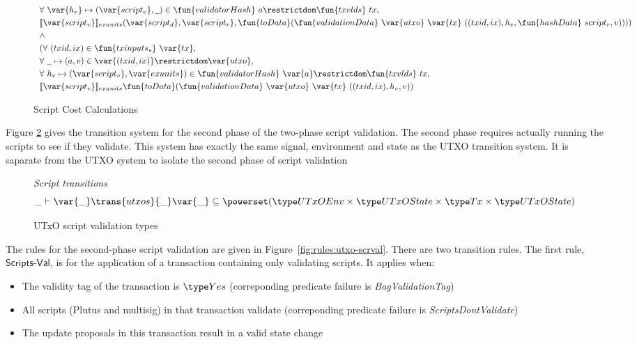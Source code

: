 \begin{figure}[htb]
\begin{align*}
    & ~~\forall ~\var{h_v}\mapsto (\var{script_v},\wcard)\in \fun{validatorHash}~{a}\restrictdom\fun{txvlds}~{tx}, \\
    & ~~ \llbracket \var{script_v} \rrbracket_{exunits} (\var{script_d},\var{script_r},
    \fun{toData}(\fun{validationData}~\var{utxo}~\var{tx}~
      ((txid,ix),h_v,\fun{hashData}~{script_r},v))) ) \\
    & ~~\wedge~ \\
    & ~~(\forall~(txid,ix) \in \fun{txinputs_s}~\var{tx}, \\
    & ~~ \forall~\wcard \mapsto (a,v) \in \var{(txid,ix)}\restrictdom\var{utxo}, \\
    & ~~\forall ~h_v\mapsto (\var{script_v},\var{exunits})\in
     \fun{validatorHash}~\var{a}\restrictdom\fun{txvlds}~{tx}, \\
    & ~~ \llbracket \var{script_v} \rrbracket_{exunits}
    \fun{toData}(\fun{validationData}~\var{utxo}~\var{tx}~
      ((txid,ix),h_v,v)) \\
  \end{align*}
  \caption{Script Cost Calculations}
  \label{fig:functions:script2}
\end{figure}

Figure \ref{fig:ts-types:utxo-scripts} gives the transition system for the second phase of
the two-phase script validation. The second phase requires actually running
the scripts to see if they validate. This system has exactly the same
signal, environment and state as the UTXO transition system. It is saparate
from the UTXO system to isolate the second phase of script validation

\begin{figure}[htb]
  \emph{Script transitions}
  \begin{equation*}
    \_ \vdash
    \var{\_} \trans{utxos}{\_} \var{\_}
    \subseteq \powerset (\UTxOEnv \times \UTxOState \times \Tx \times \UTxOState)
  \end{equation*}
  \caption{UTxO script validation types}
  \label{fig:ts-types:utxo-scripts}
\end{figure}

The rules for the second-phase script validation are given in
Figure~\ref{fig:rules:utxo-scrval}. There are two transition rules.
The first rule, $\mathsf{Scripts\mbox{-}Val}$,
is for the application of a transaction containing only
validating scripts. It applies when:

\begin{itemize}
  \item The validity tag of the transaction is $\Yes$
  (correponding predicate failure is \emph{BagValidationTag})
  \item All scripts (Plutus and multisig) in that transaction validate
  (correponding predicate failure is \emph{ScriptsDontValidate})
  \item The update proposals in this transaction result in a valid state change
\end{itemize}

